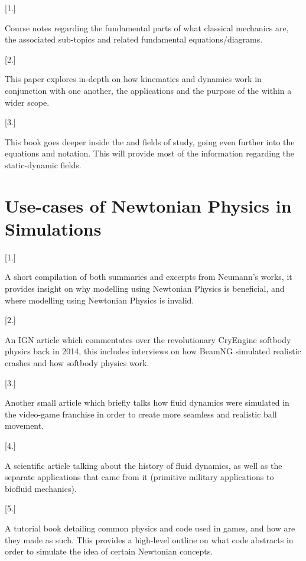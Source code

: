 \documentclass[11pt]{article}
\begin{document}

[1.] \parencite{classical_mechanics_intro} \par Course notes regarding the fundamental parts of 
what classical mechanics are, the associated sub-topics and related fundamental equations/diagrams.  

[2.] \parencite{kinematics} \par This paper explores in-depth on how kinematics and dynamics work in conjunction with one another,
the applications and the purpose of the  within a wider scope.

[3.] \parencite{static_dynamic} \par This book goes deeper inside the  and  fields of study,
going even further into the equations and notation. This will provide most of the information regarding the static-dynamic fields.

\section{Use-cases of Newtonian Physics in Simulations}

[1.] \parencite{neumann_compendium} \par A short compilation of both summaries and excerpts from Neumann's works,
it provides insight on why modelling using Newtonian Physics is beneficial, and where modelling using 
Newtonian Physics is invalid.

[2.] \parencite{beamng_softbody_physics} \par An IGN article which commentates over the revolutionary CryEngine softbody physics
back in 2014, this includes interviews on how BeamNG simulated realistic crashes and how softbody physics work.

[3.] \parencite{fifa_air_resistance} \par Another small article which briefly talks how fluid dynamics were simulated in the video-game franchise
 in order to create more seamless and realistic ball movement.

[4.] \parencite{fluid_dynamic_workings} \par A scientific article talking about the history of fluid dynamics, as well as the separate applications
that came from it (primitive military applications to biofluid mechanics). 

[5.] \parencite{game_physics} \par A tutorial book detailing common physics and code used in games, and how are they made as such.
This provides a high-level outline on what code abstracts in order to simulate the idea of certain Newtonian concepts. 
\end{document}
